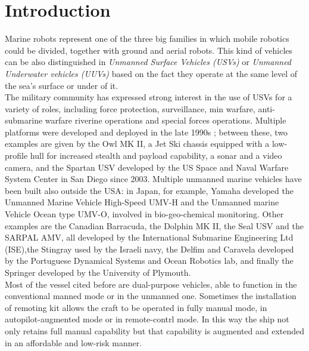\documentclass[journal]{IEEEtran}
\begin{document}
\section{Introduction} \label{introduction}

      Marine robots represent one of the three big families in which mobile robotics could be divided, together with ground and aerial robots. This kind of vehicles can be also distinguished in \textit{Unmanned Surface Vehicles (USVs)} or \textit{Unmanned Underwater vehicles (UUVs)} based on the fact they operate at the same level of the sea's surface or under of it.\\

      \indent The military community has expressed strong interest in the use of USVs for a variety of roles, including force protection, surveillance, min warfare, anti-submarine warfare riverine operations and special forces operations. Multiple platforms were developed and deployed in the late 1990s \cite{Bertram2008}; between these, two examples are given by the Owl MK II, a Jet Ski chassis equipped with a low-profile hull for increased stealth and payload capability, a sonar and a video camera, and the Spartan USV developed by the US Space and Naval Warfare System Center in San Diego since 2003. Multiple unmanned marine vehicles have been built also outside the USA: in Japan, for example, Yamaha developed the Unmanned Marine Vehicle High-Speed UMV-H and the Unmanned marine Vehicle Ocean type UMV-O, involved in bio-geo-chemical monitoring. Other examples are the Canadian Barracuda, the Dolphin MK II, the Seal USV and the SARPAL AMV, all developed by the International Submarine Engineering Ltd (ISE),the Stingray used by the Israeli navy, the Delfim and Caravela developed by the Portuguese Dynamical Systems and Ocean Robotics lab, and finally the Springer developed by the University of Plymouth.\\

      \indent Most of the vessel cited before are dual-purpose vehicles, able to function in the conventional manned mode or in the unmanned one. Sometimes the installation of remoting kit allows the craft to be operated in fully manual mode, in autopilot-augmented mode or in remote-contrl mode. In this way the ship not only retains full manual capability but that capability is augmented and extended in an affordable and low-risk manner.\\
\end{document}
